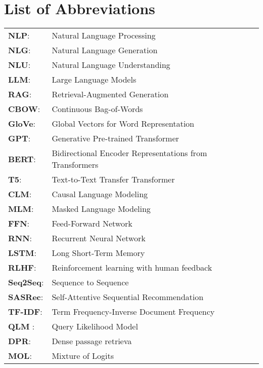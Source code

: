 \chapter*{List of Abbreviations }
\pagestyle{fancy}
\pagestyle{fancy}\rhead{\textbf \footnotesize\it{}}

\begin{tabular}{ll}
	\textbf{NLP}:& Natural Language Processing\\
	\textbf{NLG}:& Natural Language Generation\\
	\textbf{NLU}:& Natural Language Understanding\\
    \textbf{LLM}:& Large Language Models \\
    \textbf{RAG}:& Retrieval-Augmented Generation\\
    \textbf{CBOW}:& Continuous Bag-of-Words \\
    \textbf{GloVe}:& Global Vectors for Word Representation \\
    \textbf{GPT}: & Generative Pre-trained Transformer\\
	\textbf{BERT}:& Bidirectional Encoder Representations from Transformers\\
	\textbf{T5}:& Text-to-Text Transfer Transformer\\
    \textbf{CLM}: & Causal Language Modeling \\
    \textbf{MLM}: & Masked Language Modeling\\
	\textbf{FFN}:& Feed-Forward Network\\
	\textbf{RNN}:& Recurrent Neural Network\\
	\textbf{LSTM}:& Long Short-Term Memory\\
	\textbf{RLHF}:& Reinforcement learning with human feedback\\
	\textbf{Seq2Seq}:& Sequence to Sequence\\
	\textbf{SASRec}:& Self-Attentive Sequential Recommendation\\
	\textbf{TF-IDF}: & Term Frequency-Inverse Document Frequency\\
	\textbf{QLM }:& Query Likelihood Model\\
	\textbf{DPR}: & Dense passage retrieva\\
	\textbf{MOL}: & Mixture of Logits 
\end{tabular}